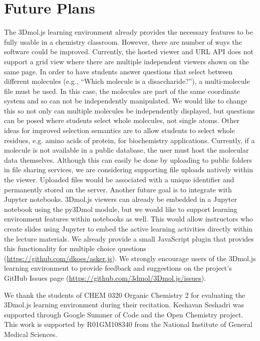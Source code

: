 \documentclass[journal=jceda8,manuscript=article]{achemso}
\begin{document}
\section{Future Plans}

The 3Dmol.js learning environment already provides the necessary features to be fully usable in a chemistry classroom.  However, there are number of ways the software could be improved.  Currently, the hosted viewer and URL API does not support a grid view where there are multiple independent viewers shown on the same page.  In order to have students answer questions that select between different molecules (e.g., ``Which molecule is a disaccharide?''), a multi-molecule file must be used. In this case, the molecules are part of the same coordinate system and so can not be independently manipulated.  We would like to change this so not only can multiple molecules be independently displayed, but questions can be posed where students select whole molecules, not single atoms.  Other ideas for improved selection semantics are to allow students to select whole residues, e.g. amino acids of protein, for biochemistry applications.  Currently, if a molecule is not available in a public database, the user must host the molecular data themselves.  Although this can easily be done by uploading to public folders in file sharing services, we are considering supporting file uploads natively within the viewer.  Uploaded files would be associated with a unique identifier and permanently stored on the server.  Another future goal is to integrate with Jupyter notebooks.  3Dmol.js viewers can already be embedded in a Jupyter notebook using the py3Dmol module, but we would like to support learning environment features within notebooks as well.  This would allow instructors who create slides using Jupyter to embed the active learning activities directly within the lecture materials. We already provide a small JavaScript plugin that provides this functionality for multiple choice questions (\url{https://github.com/dkoes/asker.js}).  
 We strongly encourage users of the 3Dmol.js learning environment to provide feedback and suggestions on the project's GitHub Issues page (\url{https://github.com/3dmol/3Dmol.js/issues}).
 


\begin{acknowledgement}


We thank the students of CHEM 0320 Organic Chemistry 2 for evaluating the 3Dmol.js learning environment during their recitation.
 Keshavan Seshadri was supported through Google Summer of Code and the Open Chemistry project.
  This work is supported by R01GM108340 from the National Institute of General Medical Sciences.

\end{acknowledgement}
\end{document}
